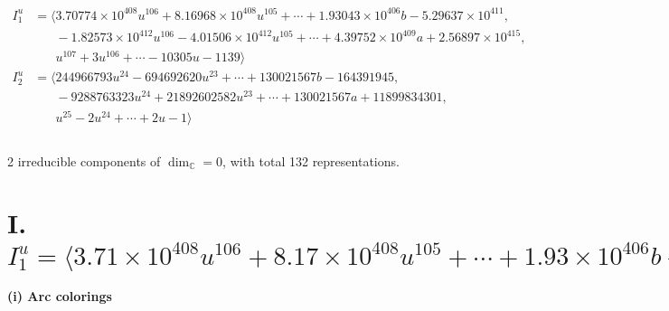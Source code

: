 \documentclass[1p]{elsarticle_modified}
\theoremstyle{definition}
\begin{document}
\begin{align*}
I^u_{1}&=\langle 
3.70774\times10^{408} u^{106}+8.16968\times10^{408} u^{105}+\cdots+1.93043\times10^{406} b-5.29637\times10^{411},\\
\phantom{I^u_{1}}&\phantom{= \langle  }-1.82573\times10^{412} u^{106}-4.01506\times10^{412} u^{105}+\cdots+4.39752\times10^{409} a+2.56897\times10^{415},\\
\phantom{I^u_{1}}&\phantom{= \langle  }u^{107}+3 u^{106}+\cdots-10305 u-1139\rangle \\
I^u_{2}&=\langle 
244966793 u^{24}-694692620 u^{23}+\cdots+130021567 b-164391945,\\
\phantom{I^u_{2}}&\phantom{= \langle  }-9288763323 u^{24}+21892602582 u^{23}+\cdots+130021567 a+11899834301,\\
\phantom{I^u_{2}}&\phantom{= \langle  }u^{25}-2 u^{24}+\cdots+2 u-1\rangle \\
\\
\end{align*}
\raggedright * 2 irreducible components of $\dim_{\mathbb{C}}=0$, with total 132 representations.\\
\newpage
\renewcommand{\arraystretch}{1}
\centering \section*{I. $I^u_{1}= \langle 3.71\times10^{408} u^{106}+8.17\times10^{408} u^{105}+\cdots+1.93\times10^{406} b-5.30\times10^{411},\;-1.83\times10^{412} u^{106}-4.02\times10^{412} u^{105}+\cdots+4.40\times10^{409} a+2.57\times10^{415},\;u^{107}+3 u^{106}+\cdots-10305 u-1139 \rangle$}
\flushleft \textbf{(i) Arc colorings}\\
\end{document}

